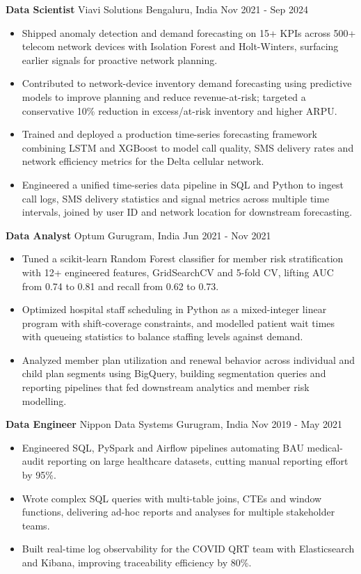 \documentclass[10pt,a4paper]{article}
\newcommand{\role}[4]{\textbf{#1} \textbar{} #2 \hfill #3 \textbar{} #4\par}
\begin{document}
\vspace{3pt}
\role{Data Scientist}{Viavi Solutions}{Bengaluru, India}{Nov 2021 - Sep 2024}
\begin{itemize}
  \item Shipped anomaly detection and demand forecasting on 15+ KPIs across 500+ telecom network devices with Isolation Forest and Holt-Winters, surfacing earlier signals for proactive network planning.
  \item Contributed to network-device inventory demand forecasting using predictive models to improve planning and reduce revenue-at-risk; targeted a conservative 10\% reduction in excess/at-risk inventory and higher ARPU.
  \item Trained and deployed a production time-series forecasting framework combining LSTM and XGBoost to model call quality, SMS delivery rates and network efficiency metrics for the Delta cellular network.
  \item Engineered a unified time-series data pipeline in SQL and Python to ingest call logs, SMS delivery statistics and signal metrics across multiple time intervals, joined by user ID and network location for downstream forecasting.
\end{itemize}
\vspace{3pt}
\role{Data Analyst}{Optum}{Gurugram, India}{Jun 2021 - Nov 2021}
\begin{itemize}
  \item Tuned a scikit-learn Random Forest classifier for member risk stratification with 12+ engineered features, GridSearchCV and 5-fold CV, lifting AUC from 0.74 to 0.81 and recall from 0.62 to 0.73.
  \item Optimized hospital staff scheduling in Python as a mixed-integer linear program with shift-coverage constraints, and modelled patient wait times with queueing statistics to balance staffing levels against demand.
  \item Analyzed member plan utilization and renewal behavior across individual and child plan segments using BigQuery, building segmentation queries and reporting pipelines that fed downstream analytics and member risk modelling.
\end{itemize}
\vspace{3pt}
\role{Data Engineer}{Nippon Data Systems}{Gurugram, India}{Nov 2019 - May 2021}
\begin{itemize}
  \item Engineered SQL, PySpark and Airflow pipelines automating BAU medical-audit reporting on large healthcare datasets, cutting manual reporting effort by 95\%.
  \item Wrote complex SQL queries with multi-table joins, CTEs and window functions, delivering ad-hoc reports and analyses for multiple stakeholder teams.
  \item Built real-time log observability for the COVID QRT team with Elasticsearch and Kibana, improving traceability efficiency by 80\%.
\end{itemize}
\end{document}
